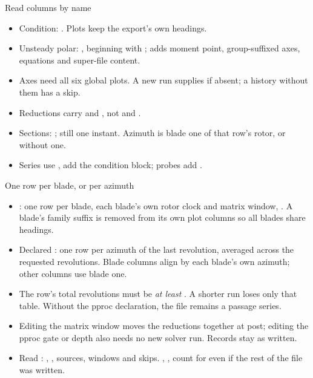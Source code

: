 \begin{frame}{Read columns by name}
\begin{itemize}\small
\item Condition: 
. Plots keep the export's own headings.
\item Unsteady polar: , beginning with
; adds moment point, group-suffixed axes,
equations and super-file content.
\item Axes need all six global  plots. A new run supplies
 if absent; a history without them has a  skip.
\item Reductions carry  and , not
 and .
\item Sections: ; still one instant.
Azimuth is blade one of that row's rotor, or  without one.
\item Series use , add the condition block; probes add .
\end{itemize}
\end{frame}

\begin{frame}{One row per blade, or per azimuth}
\begin{itemize}\small
\item {}: one row per blade, each blade's own rotor clock and matrix window,
. A blade's family suffix is
removed from its own plot columns so all blades share headings.
\item Declared : one row per azimuth of the last
revolution, averaged across the requested revolutions. Blade columns align by
each blade's own azimuth; other columns use blade one.
\item The row's total revolutions must be \emph{at least}
. A shorter run loses only that table. Without the
pproc declaration, the file remains a passage series.
\item Editing the matrix window moves the reductions together at post;
editing the pproc gate or depth also needs no new solver run. Records stay as written.
\item Read : , , sources,
windows and skips. , ,  count for
 even if the rest of the file was written.
\end{itemize}
\end{frame}

